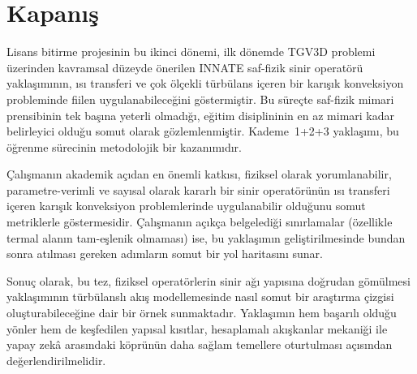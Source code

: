 \section{Kapanış}

Lisans bitirme projesinin bu ikinci dönemi, ilk dönemde TGV3D problemi üzerinden kavramsal düzeyde önerilen INNATE saf-fizik sinir operatörü yaklaşımının, ısı transferi ve çok ölçekli türbülans içeren bir karışık konveksiyon probleminde fiilen uygulanabileceğini göstermiştir. Bu süreçte saf-fizik mimari prensibinin tek başına yeterli olmadığı, eğitim disiplininin en az mimari kadar belirleyici olduğu somut olarak gözlemlenmiştir. Kademe~1+2+3 yaklaşımı, bu öğrenme sürecinin metodolojik bir kazanımıdır.

Çalışmanın akademik açıdan en önemli katkısı, fiziksel olarak yorumlanabilir, parametre-verimli ve sayısal olarak kararlı bir sinir operatörünün ısı transferi içeren karışık konveksiyon problemlerinde uygulanabilir olduğunu somut metriklerle göstermesidir. Çalışmanın açıkça belgelediği sınırlamalar (özellikle termal alanın tam-eşlenik olmaması) ise, bu yaklaşımın geliştirilmesinde bundan sonra atılması gereken adımların somut bir yol haritasını sunar.

Sonuç olarak, bu tez, fiziksel operatörlerin sinir ağı yapısına doğrudan gömülmesi yaklaşımının türbülanslı akış modellemesinde nasıl somut bir araştırma çizgisi oluşturabileceğine dair bir örnek sunmaktadır. Yaklaşımın hem başarılı olduğu yönler hem de keşfedilen yapısal kısıtlar, hesaplamalı akışkanlar mekaniği ile yapay zekâ arasındaki köprünün daha sağlam temellere oturtulması açısından değerlendirilmelidir.
